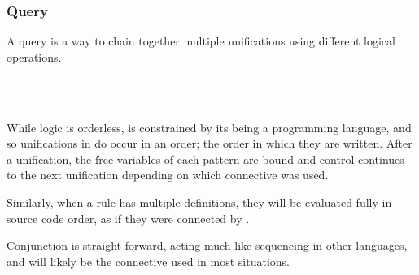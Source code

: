 \subsubsection{Query}

A query is a way to chain together multiple unifications using different
logical operations.

\begin{bnf*}
     \\
     \\
\end{bnf*}

While logic is orderless, \Law{} is constrained by its being a programming language,
and so unifications in \Law{} do occur in an order; the order in which they are
written. After a unification, the free variables of each pattern are bound and
control continues to the next unification depending on which connective was used.

Similarly, when a rule has multiple definitions, they will be evaluated fully in
source code order, as if they were connected by .

\begin{prooftree}
\end{prooftree}

Conjunction is straight forward, acting much like sequencing in other languages,
and will likely be the connective used in most situations.

\begin{center}
    \parbox[t]{0.45\linewidth}{
    \begin{prooftree}
    \end{prooftree}
    }
    \quad
    \parbox[t]{0.45\linewidth}{
    \begin{prooftree}
    \end{prooftree}
}
\end{center}

